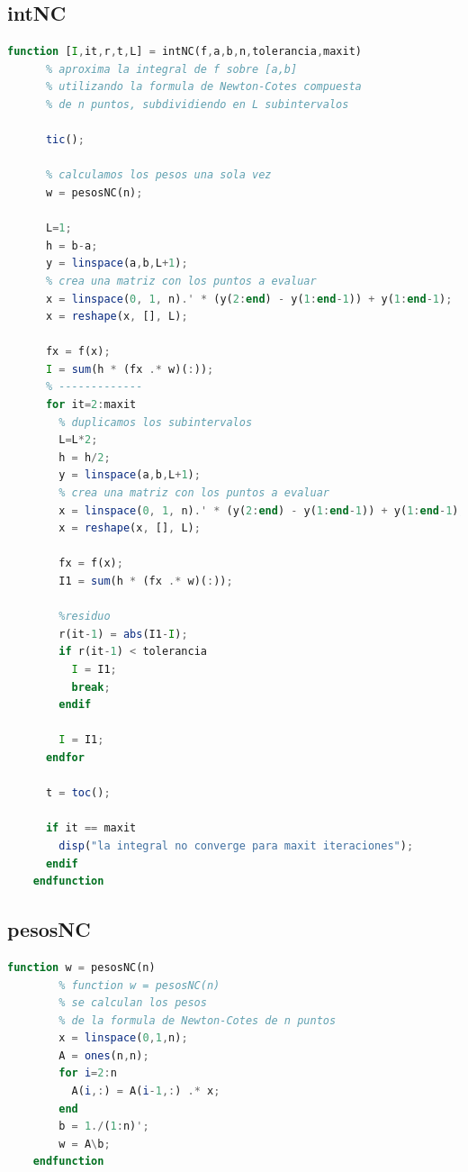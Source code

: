 \documentclass{article}
\begin{document}
    \subsection{intNC}
    \begin{lstlisting}[language=Octave]
    function [I,it,r,t,L] = intNC(f,a,b,n,tolerancia,maxit)
      % aproxima la integral de f sobre [a,b]
      % utilizando la formula de Newton-Cotes compuesta
      % de n puntos, subdividiendo en L subintervalos
    
      tic();
    
      % calculamos los pesos una sola vez
      w = pesosNC(n);
    
      L=1;
      h = b-a;
      y = linspace(a,b,L+1);
      % crea una matriz con los puntos a evaluar
      x = linspace(0, 1, n).' * (y(2:end) - y(1:end-1)) + y(1:end-1);
      x = reshape(x, [], L);
    
      fx = f(x);
      I = sum(h * (fx .* w)(:));
      % -------------
      for it=2:maxit
        % duplicamos los subintervalos
        L=L*2;
        h = h/2;
        y = linspace(a,b,L+1);
        % crea una matriz con los puntos a evaluar
        x = linspace(0, 1, n).' * (y(2:end) - y(1:end-1)) + y(1:end-1);
        x = reshape(x, [], L);
    
        fx = f(x);
        I1 = sum(h * (fx .* w)(:));
    
        %residuo
        r(it-1) = abs(I1-I);
        if r(it-1) < tolerancia
          I = I1;
          break;
        endif
    
        I = I1;
      endfor
    
      t = toc();
    
      if it == maxit
        disp("la integral no converge para maxit iteraciones");
      endif
    endfunction
    \end{lstlisting}
    
    \subsection{pesosNC}
    \begin{lstlisting}[language=Octave]
    function w = pesosNC(n)
        % function w = pesosNC(n)
        % se calculan los pesos
        % de la formula de Newton-Cotes de n puntos
        x = linspace(0,1,n);
        A = ones(n,n);
        for i=2:n
          A(i,:) = A(i-1,:) .* x;
        end
        b = 1./(1:n)';
        w = A\b;
    endfunction
    \end{lstlisting}
    
\end{document}
